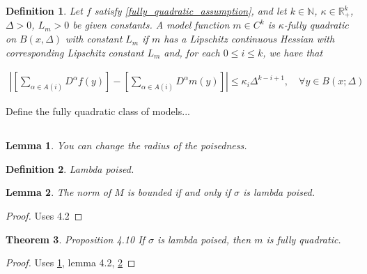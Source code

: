 \documentclass{article}
\newtheorem{theorem}{Theorem}[section]
\newtheorem{definition}{Definition}[theorem]
\newtheorem{lemma}[theorem]{Lemma}
\theoremstyle{case}
\newcommand{\naturals}{\mathbb N}
\begin{document}
\begin{definition}
\label{fully_quadratic_definition}
Let $f$ satisfy \cref{fully_quadratic_assumption}, and let $k\in\naturals$, $\kappa \in \mathbb R^k_+$, $\Delta>0$, $L_m>0$ be given constants.
A model function $m \in C^k$ is $\kappa$-fully quadratic on $B(x, \Delta)$ with constant $L_m$ if
\color{red}
$m$ has a Lipschitz continuous Hessian with corresponding Lipschitz constant $L_m$
\color{black}
and, for each $0 \le i \le k$, we have that

\begin{align*}
\left| \left[\sum_{\alpha \in A(i)} D^{\alpha} f(y)\right] - \left[\sum_{\alpha \in A(i)} D^{\alpha} m(y) \right] \right| \le \kappa_i \Delta^{k - i + 1},
\quad \forall y \in B(x; \Delta)
\end{align*}
\end{definition}

Define the fully quadratic class of models...









\subsection{}

\begin{lemma}
\label{change_radius_lemma}
You can change the radius of the poisedness.
\end{lemma}


\begin{definition}
\label{lambda_poised_definition}
Lambda poised.
\end{definition}

\begin{lemma}
\label{lambda_poised_to_norm}
The norm of $M$ is bounded if and only if $\sigma $ is lambda poised.
\end{lemma}

\begin{proof}
Uses 4.2
\end{proof}

\begin{theorem}{Proposition 4.10}
\label{lambda_poised_to_fully_quadratic}
If $\sigma$ is lambda poised, then $m$ is fully quadratic.
\end{theorem}
\begin{proof}
Uses \cref{change_radius_lemma}, lemma 4.2, \cref{lambda_poised_to_norm}
\end{proof}
\end{document}
